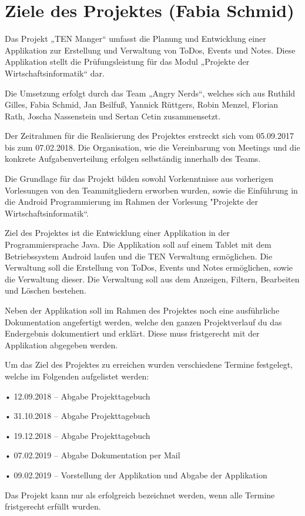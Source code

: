 \section{Ziele des Projektes (Fabia Schmid)}

Das Projekt „TEN Manger“ umfasst die Planung und Entwicklung einer Applikation zur Erstellung und Verwaltung von ToDos, Events und Notes. Diese Applikation stellt die Prüfungsleistung für das Modul „Projekte der Wirtschaftsinformatik“ dar.

Die Umsetzung erfolgt durch das Team „Angry Nerds“, welches sich aus Ruthild Gilles, Fabia Schmid, Jan Beilfuß, Yannick Rüttgers, Robin Menzel, Florian Rath, Joscha Nassenstein und Sertan Cetin zusammensetzt.

Der Zeitrahmen für die Realisierung des Projektes erstreckt sich vom 05.09.2017 bis zum 07.02.2018. Die Organisation, wie die Vereinbarung von Meetings und die konkrete Aufgabenverteilung erfolgen selbständig innerhalb des Teams.

Die Grundlage für das Projekt bilden sowohl Vorkenntnisse aus vorherigen Vorlesungen von den Teammitgliedern erworben wurden, sowie die Einführung in die Android Programmierung im Rahmen der Vorlesung "Projekte der Wirtschaftsinformatik“.

Ziel des Projektes ist die Entwicklung einer Applikation in der Programmiersprache Java. Die Applikation soll auf einem Tablet mit dem Betriebssystem Android laufen und die TEN Verwaltung ermöglichen. Die Verwaltung soll die Erstellung von ToDos, Events und Notes ermöglichen, sowie die Verwaltung dieser. Die Verwaltung soll aus dem Anzeigen, Filtern, Bearbeiten und Löschen bestehen.

Neben der Applikation soll im Rahmen des Projektes noch eine ausführliche Dokumentation angefertigt werden, welche den ganzen Projektverlauf du das Endergebnis dokumentiert und erklärt. Diese muss fristgerecht mit der Applikation abgegeben werden.

\newpage

Um das Ziel des Projektes zu erreichen wurden verschiedene Termine festgelegt, welche im Folgenden aufgelistet werden:

•	12.09.2018 – Abgabe Projekttagebuch

•	31.10.2018 – Abgabe Projekttagebuch

•	19.12.2018 – Abgabe Projekttagebuch

•	07.02.2019 – Abgabe Dokumentation per Mail

•	09.02.2019 – Vorstellung der Applikation und Abgabe der Applikation

Das Projekt kann nur als erfolgreich bezeichnet werden, wenn alle Termine fristgerecht erfüllt wurden.


